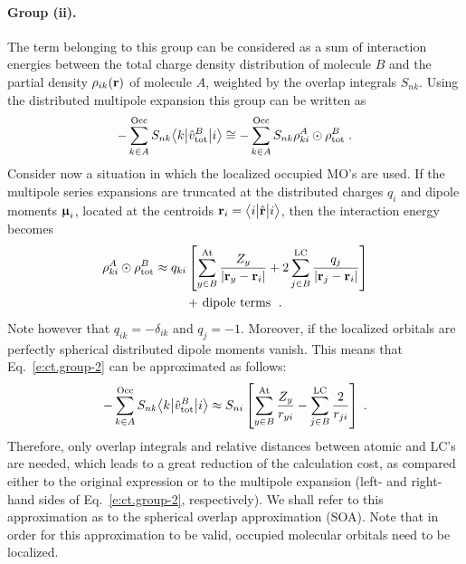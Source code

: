 \paragraph{Group (ii).}
The term belonging to this group can be considered as a sum of interaction
energies between the total charge density distribution of molecule $B$
and the partial density $\rho_{ik}({\bf r})$ of molecule $A$,
weighted by the overlap integrals $S_{nk}$. Using the distributed multipole 
expansion this group can be written as
%
\begin{equation} \label{e:ct.group-2}
      - \sum_{k\in A}^{\rm Occ} S_{nk} \bigl\langle {k} \bigl\lvert {\hat{v}^B_{\rm tot} } \bigl\lvert {i} \bigr\rangle 
 \cong - \sum_{k\in A}^{\rm Occ} S_{nk} \rho_{ki}^A \odot \rho^B_{\rm tot} \;.
\end{equation}
%
Consider now a situation in which the localized occupied MO's are used.
If the multipole series expansions are truncated
at the distributed charges $q_i$ and dipole moments ${\bm{\upmu}_i}$, 
located at the centroids ${\bf r}_i = \bigl\langle {i} \bigl\lvert {\hat{\bf r}} \bigl\lvert {i} \bigr\rangle$, 
then the interaction energy becomes
%
\begin{multline}
 \rho_{ki}^A \odot \rho^B_{\rm tot} 
 \approx 
 q_{ki} 
 \left[
 \sum_{y\in B}^{\rm At}
  \frac{Z_y}{\vert {\bf r}_y - {\bf r}_i \vert } 
 +
 2\sum_{j\in B}^{\rm LC}
  \frac{q_j}{\vert {\bf r}_j - {\bf r}_i \vert } 
 \right] \\
 + \text{ dipole terms } \;.
\end{multline}
%
Note however that $q_{ik} = -\delta_{ik}$ and $q_j = -1$. Moreover, 
if the localized orbitals are perfectly spherical distributed dipole moments vanish.
This means that Eq.~\eqref{e:ct.group-2} can be approximated as follows:
%
\begin{equation}
      - \sum_{k\in A}^{\rm Occ} S_{nk} \bigl\langle {k} \bigl\lvert {\hat{v}^B_{\rm tot} } \bigl\lvert {i} \bigr\rangle 
 \approx S_{ni}  \left[
 \sum_{y\in B}^{\rm At}
  \frac{Z_y}{ r_{yi} } 
 -
 \sum_{j\in B}^{\rm LC}
  \frac{2}{r_{ji}} 
 \right] \;.
\end{equation}
%
Therefore, only overlap integrals and relative distances between
atomic and LC's are needed, which leads to a great reduction of the
calculation cost,
as compared either to the original expression or to the multipole expansion (left\hyp{} and right\hyp{}hand sides
of Eq.~\eqref{e:ct.group-2}, respectively).
We shall refer to this approximation as to
the spherical overlap approximation (SOA). Note that in order for this approximation to be valid,
occupied molecular orbitals need to be localized.

